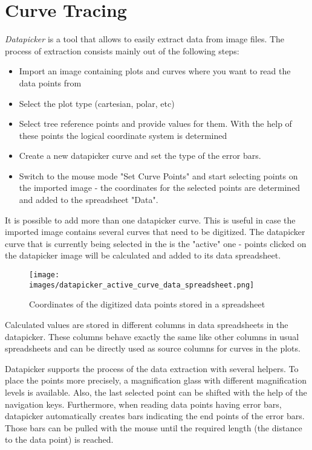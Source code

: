 \section{Curve Tracing}\label{sec:curve_tracing}
\textit{Datapicker} is a tool that allows to easily extract data from image files. The process of extraction consists mainly out of the following steps:
\begin{itemize}
\item Import an image containing plots and curves where you want to read the data points from
\item Select the plot type (cartesian, polar, etc)
\item Select tree reference points and provide values for them. With the help of these points the logical coordinate system is determined
\item Create a new datapicker curve and set the type of the error bars.
\item Switch to the mouse mode "Set Curve Points" and start selecting points on the imported image - the coordinates for the selected points are determined and added to the spreadsheet "Data".
\end{itemize}

It is possible to add more than one datapicker curve. This is useful in case the imported image contains several curves that need to be digitized.
The datapicker curve that is currently being selected in the  is the "active" one - points clicked on the datapicker image will be calculated and added to its data spreadsheet.
\begin{figure}
\texttt{[image: images/datapicker\_active\_curve\_data\_spreadsheet.png]}
\caption{Coordinates of the digitized data points stored in a spreadsheet}
\end{figure}

Calculated values are stored in different columns in data spreadsheets in the datapicker. These columns behave exactly the same like other columns
in usual spreadsheets and can be directly used as source columns for curves in the plots.

Datapicker supports the process of the data extraction with several helpers. To place the points more precisely, a magnification glass with different magnification levels is available.
Also, the last selected point can be shifted with the help of the navigation keys.
Furthermore, when reading data points having error bars, datapicker automatically creates bars indicating the end points of the error bars.
Those bars can be pulled with the mouse until the required length (the distance to the data point) is reached.

